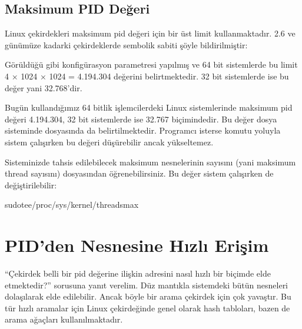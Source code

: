 \documentclass[a4paper,10pt,turkish]{sphinxmanual}
\begin{document}
\subsection{Maksimum PID Değeri}
\label{\detokenize{processcontrolblock:maksimum-pid-degeri}}
\sphinxAtStartPar
Linux çekirdekleri maksimum pid değeri için bir üst limit kullanmaktadır. 2.6 ve günümüze kadarki
çekirdeklerde  sembolik sabiti şöyle bildirilmiştir:

\begin{sphinxVerbatim}[commandchars=\\\{\}]
\end{sphinxVerbatim}

\sphinxAtStartPar
Görüldüğü gibi  konfigürasyon parametresi  yapılmış ve 64 bit sistemlerde bu
limit 4 × 1024 × 1024 = 4.194.304 değerini belirtmektedir. 32 bit sistemlerde ise bu değer 
yani 32.768’dir.

\sphinxAtStartPar
Bugün kullandığımız 64 bitlik işlemcilerdeki Linux sistemlerinde maksimum pid değeri 4.194.304, 32 bit
sistemlerde ise 32.767 biçimindedir. Bu değer  dosya sisteminde 
dosyasında da belirtilmektedir. Programcı isterse  komutu yoluyla sistem çalışırken bu değeri
düşürebilir ancak yükseltemez.

\sphinxAtStartPar
Sisteminizde tahsis edilebilecek maksimum  nesnelerinin sayısını (yani maksimum thread
sayısını)  dosyasından öğrenebilirsiniz. Bu değer sistem çalışırken de
değiştirilebilir:

\begin{sphinxVerbatim}[commandchars=\\\{\}]
\PYGZdl{}sudotee/proc/sys/kernel/threads\PYGZhy{}max
\end{sphinxVerbatim}


\section{PID’den  Nesnesine Hızlı Erişim}
\label{\detokenize{processcontrolblock:pid-den-task-struct-nesnesine-hizli-erisim}}
\sphinxAtStartPar
“Çekirdek belli bir pid değerine ilişkin  adresini nasıl hızlı bir biçimde elde
etmektedir?” sorusuna yanıt verelim. Düz mantıkla sistemdeki bütün  nesneleri dolaşılarak
elde edilebilir. Ancak böyle bir arama çekirdek için çok yavaştır. Bu tür hızlı aramalar için Linux
çekirdeğinde genel olarak hash tabloları, bazen de arama ağaçları kullanılmaktadır.
\end{document}
